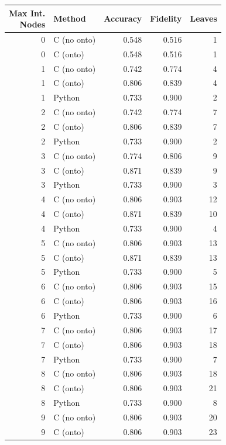\begin{table}[ht]
\centering
\footnotesize
\begin{tabular}{r l r r r}
\toprule
\makecell{Max Int.\\Nodes} & Method & Accuracy & Fidelity & Leaves \\
\midrule
0 & C (no onto)  & 0.548 & 0.516 & 1 \\
0 & C (onto)     & 0.548 & 0.516 & 1 \\
\midrule
1 & C (no onto)  & 0.742 & 0.774 & 4 \\
1 & C (onto)     & 0.806 & 0.839 & 4 \\
1 & Python       & 0.733 & 0.900 & 2 \\
\midrule
2 & C (no onto)  & 0.742 & 0.774 & 7 \\
2 & C (onto)     & 0.806 & 0.839 & 7 \\
2 & Python       & 0.733 & 0.900 & 2 \\
\midrule
3 & C (no onto)  & 0.774 & 0.806 & 9 \\
3 & C (onto)     & 0.871 & 0.839 & 9 \\
3 & Python       & 0.733 & 0.900 & 3 \\
\midrule
4 & C (no onto)  & 0.806 & 0.903 & 12 \\
4 & C (onto)     & 0.871 & 0.839 & 10 \\
4 & Python       & 0.733 & 0.900 & 4 \\
\midrule
5 & C (no onto)  & 0.806 & 0.903 & 13 \\
5 & C (onto)     & 0.871 & 0.839 & 13 \\
5 & Python       & 0.733 & 0.900 & 5 \\
\midrule
6 & C (no onto)  & 0.806 & 0.903 & 15 \\
6 & C (onto)     & 0.806 & 0.903 & 16 \\
6 & Python       & 0.733 & 0.900 & 6 \\
\midrule
7 & C (no onto)  & 0.806 & 0.903 & 17 \\
7 & C (onto)     & 0.806 & 0.903 & 18 \\
7 & Python       & 0.733 & 0.900 & 7 \\
\midrule
8 & C (no onto)  & 0.806 & 0.903 & 18 \\
8 & C (onto)     & 0.806 & 0.903 & 21 \\
8 & Python       & 0.733 & 0.900 & 8 \\
\midrule
9 & C (no onto)  & 0.806 & 0.903 & 20 \\
9 & C (onto)     & 0.806 & 0.903 & 23 \\

\end{tabular}
\end{table}
